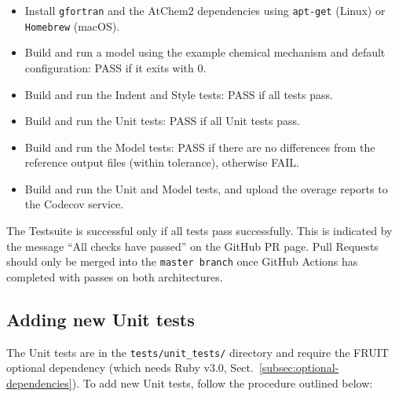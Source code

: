\begin{itemize}
\item Install \texttt{gfortran} and the AtChem2 dependencies using
  \texttt{apt-get} (Linux) or \texttt{Homebrew} (macOS).
\item Build and run a model using the example chemical mechanism and
  default configuration: PASS if it exits with 0.
\item Build and run the Indent and Style tests: PASS if all tests pass.
\item Build and run the Unit tests: PASS if all Unit tests pass.
\item Build and run the Model tests: PASS if there are no differences
  from the reference output files (within tolerance), otherwise FAIL.
\item Build and run the Unit and Model tests, and upload the overage
  reports to the Codecov service.
\end{itemize}

The Testsuite is successful only if all tests pass successfully. This is
indicated by the message ``All checks have passed'' on the GitHub PR page.
Pull Requests should only be merged into the \texttt{master\ branch}
once GitHub Actions has completed with passes on both architectures.

\subsection{Adding new Unit tests} \label{subsec:adding-new-unit-tests}

The Unit tests are in the \texttt{tests/unit\_tests/} directory and
require the FRUIT optional dependency (which needs Ruby v3.0,
Sect.~\ref{subsec:optional-dependencies}). To add new Unit tests,
follow the procedure outlined below:

